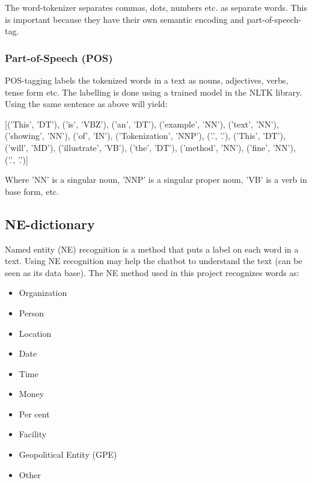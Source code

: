 The word-tokenizer separates commas, dots, numbers etc. as separate words. This is important because they have their own semantic encoding and part-of-speech-tag.  
\subsubsection{Part-of-Speech (POS)}
POS-tagging labels the tokenized words in a text as nouns, adjectives, verbs, tense form etc. The labelling is done using a trained model in the NLTK library. 
Using the same sentence as above will yield:

[('This', 'DT'), ('is', 'VBZ'), ('an', 'DT'), ('example', 'NN'), ('text', 'NN'), ('showing', 'NN'), ('of', 'IN'), ('Tokenization', 'NNP'), ('.', '.'), ('This', 'DT'), ('will', 'MD'), ('illustrate', 'VB'), ('the', 'DT'), ('method', 'NN'), ('fine', 'NN'), ('.', '.')]

Where 'NN' is a singular noun, 'NNP' is a singular proper noun, 'VB' is a verb in base form, etc. 

\subsection{NE-dictionary}
Named entity (NE) recognition is a method that puts a label on each word in a text. Using NE recognition may help the chatbot to understand the text (can be seen as its data base). The NE method used in this project recognizes words as:

\begin{itemize}
  \item Organization
  \item Person
  \item Location
  \item Date
  \item Time
  \item Money
  \item Per cent
  \item Facility
  \item Geopolitical Entity (GPE)
  \item Other
\end{itemize}



